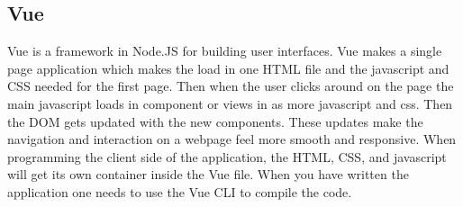\subsection{Vue}
Vue is a framework in Node.JS for building user interfaces. Vue makes a single page application which makes the load in one HTML file and the javascript and CSS needed for the first page. Then when the user clicks around on the page the main javascript loads in component or views in as more javascript and css. Then the DOM gets updated with the new components. These updates make the navigation and interaction on a webpage feel more smooth and responsive. When programming the client side of the application, the HTML, CSS, and javascript will get its own container inside the Vue file. When you have written the application one needs to use the Vue CLI to compile the code.



